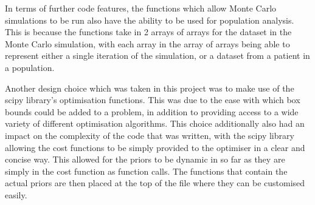 In terms of further code features, the functions which allow Monte Carlo simulations to be run also have the ability to be used for population analysis. This is because the functions take in 2 arrays of arrays for the dataset in the Monte Carlo simulation, with each array in the array of arrays being able to represent either a single iteration of the simulation, or a dataset from a patient in a population.

Another design choice which was taken in this project was to make use of the scipy library's optimisation functions. This was due to the ease with which box bounds could be added to a problem, in addition to providing access to a wide variety of different optimisation algorithms. This choice additionally also had an impact on the complexity of the code that was written, with the scipy library allowing the cost functions to be simply provided to the optimiser in a clear and concise way. This allowed for the priors to be dynamic in so far as they are simply in the cost function as function calls. The functions that contain the actual priors are then placed at the top of the file where they can be customised easily. 